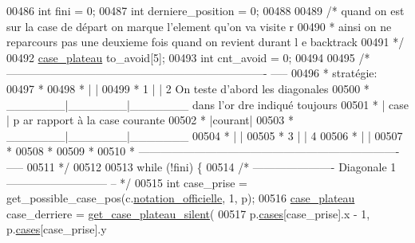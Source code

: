 \begin{DoxyCode}
00486         \textcolor{keywordtype}{int} fini = 0;
00487         \textcolor{keywordtype}{int} derniere\_position = 0;
00488 
00489         \textcolor{comment}{/* quand on est sur la case de départ on marque l'element qu'on va visite
      r}
00490 \textcolor{comment}{         * ainsi on ne reparcours pas une deuxieme fois quand on revient durant l
      e backtrack}
00491 \textcolor{comment}{         */}
00492         \hyperlink{structcase__plateau}{case_plateau} to\_avoid[5];
00493         \textcolor{keywordtype}{int} cnt\_avoid = 0;
00494 
00495         \textcolor{comment}{/* ----------------------------------------------------------------------
      -----}
00496 \textcolor{comment}{         * stratégie:}
00497 \textcolor{comment}{         *}
00498 \textcolor{comment}{         *                     |       |}
00499 \textcolor{comment}{         *         1   |       |   2                            On teste d'abord 
      les diagonales}
00500 \textcolor{comment}{         *              \_\_\_\_\_\_\_|\_\_\_\_\_\_\_|\_\_\_\_\_\_\_                         dans l'or
      dre indiqué toujours}
00501 \textcolor{comment}{         *                     | case  |                                        p
      ar rapport à la case courante}
00502 \textcolor{comment}{         *             |courant|}
00503 \textcolor{comment}{         *              \_\_\_\_\_\_\_|\_\_\_\_\_\_\_|\_\_\_\_\_\_\_}
00504 \textcolor{comment}{         *                     |       |}
00505 \textcolor{comment}{         *                 3   |       |   4}
00506 \textcolor{comment}{         *             |       |}
00507 \textcolor{comment}{         *}
00508 \textcolor{comment}{         *}
00509 \textcolor{comment}{         *}
00510 \textcolor{comment}{         * ----------------------------------------------------------------------
      -----}
00511 \textcolor{comment}{         */}
00512 
00513         \textcolor{keywordflow}{while} (!fini) \{
00514                 \textcolor{comment}{/* ---------------------- Diagonale 1 ---------------------------
      -- */}
00515                 \textcolor{keywordtype}{int} case\_prise = get\_possible\_case\_pos(c.\hyperlink{structcase__plateau_ad510581b324604a9cf685cbb769a421a}{notation_officielle}, 1, 
      p);
00516                 \hyperlink{structcase__plateau}{case_plateau} case\_derriere = \hyperlink{plateau_8h_a60a8f706865d0ae9087f8d65d4667655}{get_case_plateau_silent}(
00517                                 p.\hyperlink{structplateau_a6afaa60f594542e0d742b0c6d3223392}{cases}[case\_prise].x - 1, p.\hyperlink{structplateau_a6afaa60f594542e0d742b0c6d3223392}{cases}[case\_prise].y 

\end{DoxyCode}
